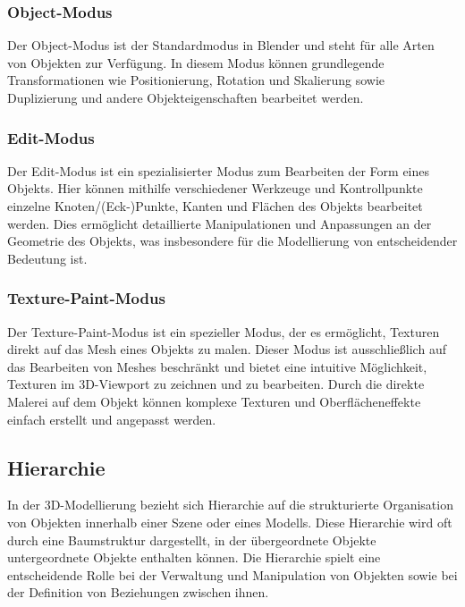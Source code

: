 \subsubsection{Object-Modus}
Der Object-Modus ist der Standardmodus in Blender und steht für alle Arten von Objekten zur Verfügung. In diesem Modus können grundlegende Transformationen wie Positionierung, Rotation und Skalierung sowie Duplizierung und andere Objekteigenschaften bearbeitet werden.

\subsubsection{Edit-Modus}
Der Edit-Modus ist ein spezialisierter Modus zum Bearbeiten der Form eines Objekts. Hier können mithilfe verschiedener Werkzeuge und Kontrollpunkte einzelne Knoten/(Eck-)Punkte, Kanten und Flächen des Objekts bearbeitet werden. Dies ermöglicht detaillierte Manipulationen und Anpassungen an der Geometrie des Objekts, was insbesondere für die Modellierung von entscheidender Bedeutung ist.

\subsubsection{Texture-Paint-Modus}
Der Texture-Paint-Modus ist ein spezieller Modus, der es ermöglicht, Texturen direkt auf das Mesh eines Objekts zu malen. Dieser Modus ist ausschließlich auf das Bearbeiten von Meshes beschränkt und bietet eine intuitive Möglichkeit, Texturen im 3D-Viewport zu zeichnen und zu bearbeiten. Durch die direkte Malerei auf dem Objekt können komplexe Texturen und Oberflächeneffekte einfach erstellt und angepasst werden.

\subsection{\label{sec:hierarchie}Hierarchie}
In der 3D-Modellierung bezieht sich Hierarchie auf die strukturierte Organisation von Objekten innerhalb einer Szene oder eines Modells. Diese Hierarchie wird oft durch eine Baumstruktur dargestellt, in der übergeordnete Objekte untergeordnete Objekte enthalten können. Die Hierarchie spielt eine entscheidende Rolle bei der Verwaltung und Manipulation von Objekten sowie bei der Definition von Beziehungen zwischen ihnen.

